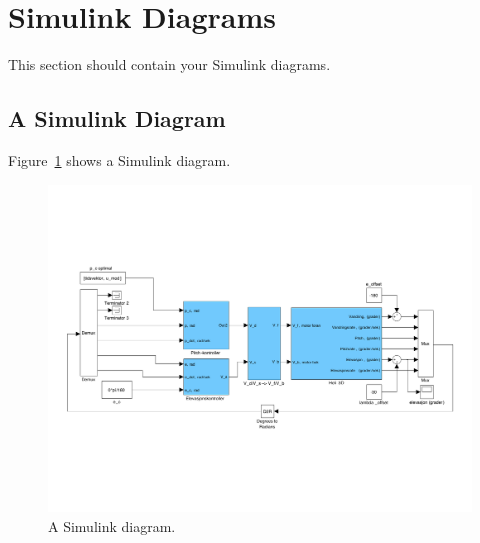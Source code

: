 \section{Simulink Diagrams}\label{sec:simulink}
This section should contain your Simulink diagrams.

\subsection{A Simulink Diagram}
Figure~\ref{fig:simulink} shows a Simulink diagram.
\begin{figure}[htb]
	\centering
		\includegraphics[width = \textwidth]{figures/simulink.pdf}
	\caption{A Simulink diagram.}
	\label{fig:simulink}
\end{figure}
